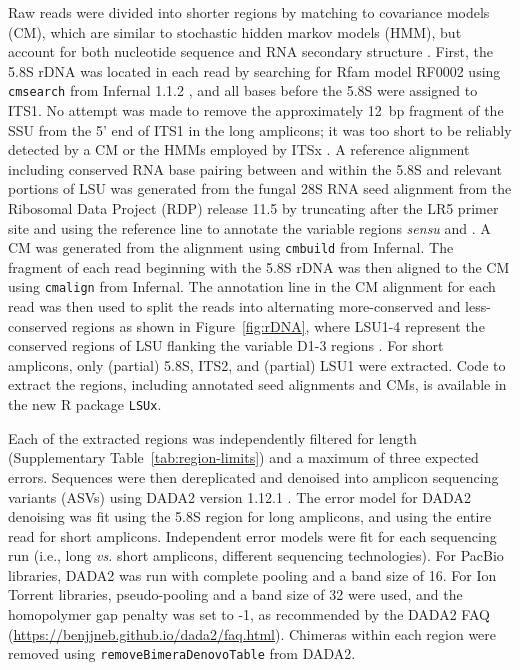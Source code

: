 \documentclass[
  12pt,
]{article}
\begin{document}
Raw reads were divided into shorter regions by matching to covariance models (CM), which are similar to stochastic hidden markov models (HMM), but account for both nucleotide sequence and RNA secondary structure \autocite{eddy1994}.
First, the 5.8S rDNA was located in each read by searching for Rfam model RF0002 \autocite{kalvari2018} using \texttt{cmsearch} from Infernal 1.1.2 \autocite{nawrocki2013}, and all bases before the 5.8S were assigned to ITS1.
No attempt was made to remove the approximately 12~bp fragment of the SSU from the 5' end of ITS1 in the long amplicons; it was too short to be reliably detected by a CM or the HMMs employed by ITSx \autocite{bengtsson-palme2013}.
A reference alignment including conserved RNA base pairing between and within the 5.8S and relevant portions of LSU was generated from the fungal 28S RNA seed alignment from the Ribosomal Data Project (RDP) release 11.5 \autocite{glockner2017,cole2014} by truncating after the LR5 primer site and using the reference line to annotate the variable regions \emph{sensu} \textcite{michot1984} and \textcite{raue1988}.
A CM was generated from the alignment using \texttt{cmbuild} from Infernal.
The fragment of each read beginning with the 5.8S rDNA was then aligned to the CM using \texttt{cmalign} from Infernal.
The annotation line in the CM alignment for each read was then used to split the reads into alternating more-conserved and less-conserved regions as shown in Figure~\ref{fig:rDNA},
where LSU1-4 represent the conserved regions of LSU flanking the variable D1-3 regions \autocite{michot1984}.
For short amplicons, only (partial) 5.8S, ITS2, and (partial) LSU1 were extracted.
Code to extract the regions, including annotated seed alignments and CMs, is available in the new R package \texttt{LSUx}.

Each of the extracted regions was independently filtered for length (Supplementary Table~\ref{tab:region-limits}) and a maximum of three expected errors.
Sequences were then dereplicated and denoised into amplicon sequencing variants (ASVs) using DADA2 version 1.12.1 \autocite{callahan2016,callahan2019}.
The error model for DADA2 denoising was fit using the 5.8S region for long amplicons, and using the entire read for short amplicons.
Independent error models were fit for each sequencing run (i.e., long \emph{vs.} short amplicons, different sequencing technologies).
For PacBio libraries, DADA2 was run with complete pooling and a band size of 16.
For Ion Torrent libraries, pseudo-pooling and a band size of 32 were used, and the homopolymer gap penalty was set to -1, as recommended by the DADA2 FAQ (\url{https://benjjneb.github.io/dada2/faq.html}).
Chimeras within each region were removed using \texttt{removeBimeraDenovoTable} from DADA2.
\end{document}
